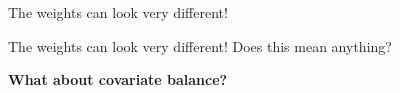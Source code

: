 
\begin{frame}[c]{The weights can look very different!}
\centering


The weights can look very different! Does this mean anything?\\[1em]



{
\vspace{1em}
\textbf{What about covariate balance?}
}


\end{frame}
